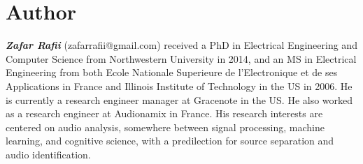 \documentclass[journal]{IEEEtran}
\begin{document}
\section{Author}

\textit{\textbf{Zafar Rafii}} (zafarrafii@gmail.com) received a PhD in Electrical Engineering and Computer Science from Northwestern University in 2014, and an MS in Electrical Engineering from both Ecole Nationale Superieure de l’Electronique et de ses Applications in France and Illinois Institute of Technology in the US in 2006. He is currently a research engineer manager at Gracenote in the US. He also worked as a research engineer at Audionamix in France. His research interests are centered on audio analysis, somewhere between signal processing, machine learning, and cognitive science, with a predilection for source separation and audio identification.



\end{document}
